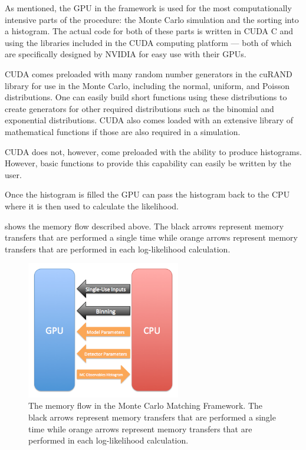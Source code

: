 As mentioned, the GPU in the framework is used for the most computationally intensive parts of the procedure: the Monte Carlo simulation and the sorting into a histogram.  The actual code for both of these parts is written in CUDA C and using the libraries included in the CUDA computing platform --- both of which are specifically designed by NVIDIA for easy use with their GPUs.

CUDA comes preloaded with many random number generators in the cuRAND library for use in the Monte Carlo, including the normal, uniform, and Poisson distributions.  One can easily build short functions using these distributions to create generators for other required distributions such as the binomial and exponential distributions.  CUDA also comes loaded with an extensive library of mathematical functions if those are also required in a simulation.  

CUDA does not, however, come preloaded with the ability to produce histograms.  However, basic functions to provide this capability can easily be written by the user.  

Once the histogram is filled the GPU can pass the histogram back to the CPU where it is then used to calculate the likelihood.

 shows the memory flow described above.  The black arrows represent memory transfers that are performed a single time while orange arrows represent memory transfers that are performed in each log-likelihood calculation.  


\begin{figure}[t]
        \centering
	\includegraphics[width=0.6\textwidth]{gpu_usage}
	\caption{The memory flow in the Monte Carlo Matching Framework.  The black arrows represent memory transfers that are performed a single time while orange arrows represent memory transfers that are performed in each log-likelihood calculation.}
	\label{fig:gpu_usage}
\end{figure}




